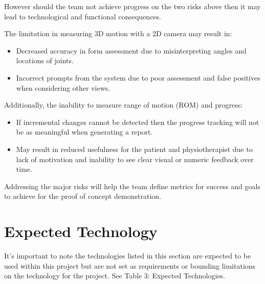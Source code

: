 \documentclass{article}
\begin{document}
\noindent However should the team not achieve progress on the two risks above then it may lead to technological and functional consequences. 

The limitation in measuring 3D motion with a 2D camera may result in:
\begin{itemize}
  \item Decreased accuracy in form assessment due to misinterpreting angles and locations of joints.
  \item Incorrect prompts from the system due to poor assessment and false positives when considering other views.
\end{itemize}


\noindent Additionally, the inability to measure range of motion (ROM) and progress:

\begin{itemize}
  \item If incremental changes cannot be detected then the progress tracking will not be as meaningful when generating a report.
  \item May result in reduced usefulness for the patient and physiotherapist due to lack of motivation and inability to see clear visual or numeric feedback over time.
\end{itemize}

\noindent Addressing the major risks will help the team define metrics for success and goals to achieve for the proof of concept demonstration.


\section{Expected Technology}

It’s important to note the technologies listed in this section are expected to be used within this project but are not set as requirements or bounding limitations on the technology for the project. See Table 3: Expected Technologies.
\end{document}
